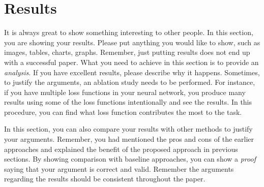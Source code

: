 \section{Results}

It is always great to show something interesting to other people. In this section, you are showing your results. Please put anything you would like to show, such as images, tables, charts, graphs. Remember, just putting results does not end up with a successful paper. What you need to achieve in this section is to provide an \emph{analysis}. If you have excellent results, please describe why it happens. Sometimes, to justify the arguments, an ablation study needs to be performed. For instance, if you have multiple loss functions in your neural network, you produce many results using some of the loss functions intentionally and see the results. In this procedure, you can find what loss function contributes the most to the task.

In this section, you can also compare your results with other methods to justify your arguments. Remember, you had mentioned the pros and cons of the earlier approaches and explained the benefit of the proposed approach in previous sections. By showing comparison with baseline approaches, you can show a \emph{proof} saying that your argument is correct and valid. Remember the arguments regarding the results should be consistent throughout the paper.